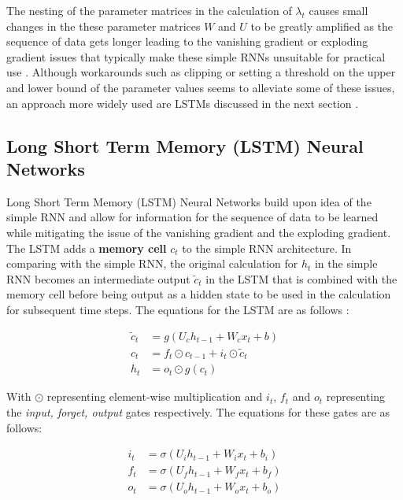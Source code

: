The nesting of the parameter matrices in the calculation of $\lambda_t$ causes small changes in the these parameter matrices $W$ and $U$ to be greatly amplified as the sequence of data gets longer leading to the vanishing gradient or exploding gradient issues that typically make these simple RNNs unsuitable for practical use \cite{salemRecurrentNeuralNetworks2022}. Although workarounds such as clipping or setting a threshold on the upper and lower bound of the parameter values seems to alleviate some of these issues, an approach more widely used are LSTMs discussed in the next section \cite{salemRecurrentNeuralNetworks2022}.

\subsection{Long Short Term Memory (LSTM) Neural Networks}
Long Short Term Memory (LSTM) Neural Networks build upon idea of the simple RNN and allow for information for the sequence of data to be learned while mitigating the issue of the vanishing gradient and the exploding gradient. The LSTM adds a \textbf{memory cell} $c_t$ to the simple RNN architecture. In comparing with the simple RNN, the original calculation for $h_t$ in the simple RNN becomes an intermediate output $\tilde{c}_t$ in the LSTM that is combined with the memory cell before being output as a hidden state to be used in the calculation for subsequent time steps. The equations for the LSTM are as follows \cite{salemRecurrentNeuralNetworks2022}:

\begin{equation}
    \begin{split}
        \tilde{c}_t &= g(U_ch_{t-1}+W_cx_t + b) \\
        c_t &= f_t \odot c_{t-1} + i_t \odot \tilde{c}_t \\
        h_t &= o_t \odot g(c_t)
    \end{split}
\end{equation}

With $\odot$ representing element-wise multiplication and $i_t$, $f_t$ and $o_t$ representing the \textit{input, forget, output} gates respectively. The equations for these gates are as follows:

\begin{equation}
    \begin{split}
        i_t &= \sigma(U_ih_{t-1} + W_i x_t + b_i) \\
        f_t &= \sigma(U_fh_{t-1} + W_f x_t + b_f) \\
        o_t &= \sigma(U_oh_{t-1} + W_o x_t + b_o) \\
    \end{split}
\end{equation}

